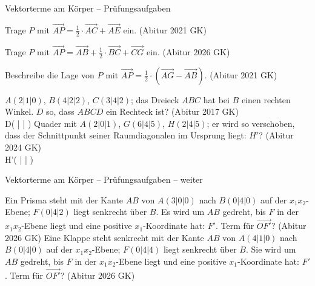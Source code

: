 \begin{aufgabe}{Vektorterme am Körper – Prüfungsaufgaben}
\begin{teile}
\teil Trage $P$ mit $\overrightarrow{AP} = \frac{1}{2} \cdot \overrightarrow{AC} + \overrightarrow{AE}$ ein. \hfill (Abitur 2021 GK)

\begin{ksys3}[x1max=7]          \end{ksys3}
\teil Trage $P$ mit $\overrightarrow{AP} = \overrightarrow{AB} + \frac{1}{2} \cdot \overrightarrow{BC} + \overrightarrow{CG}$ ein. \hfill (Abitur 2026 GK)

\begin{ksys3}[x1max=7]          \end{ksys3}
\teil Beschreibe die Lage von $P$ mit $\overrightarrow{AP} = \frac{1}{2} \cdot (\overrightarrow{AG} - \overrightarrow{AB})$. \hfill (Abitur 2021 GK)

\begin{ksys3}[x1max=7]          \end{ksys3}
\teil $A(2 | 1 | 0)$, $B(4 | 2 | 2)$, $C(3 | 4 | 2)$; das Dreieck $ABC$ hat bei $B$ einen rechten Winkel. $D$ so, dass $ABCD$ ein Rechteck ist? \hfill (Abitur 2017 GK) \\ D( \leerfeld | \leerfeld | \leerfeld )
\teil Quader mit $A(2 | 0 | 1)$, $G(6 | 4 | 5)$, $H(2 | 4 | 5)$; er wird so verschoben, dass der Schnittpunkt seiner Raumdiagonalen im Ursprung liegt: $H'$? \hfill (Abitur 2024 GK) \\ H'( \leerfeld | \leerfeld | \leerfeld )
\end{teile}
\end{aufgabe}

\begin{aufgabe}{Vektorterme am Körper – Prüfungsaufgaben – weiter}
\begin{teile}
\teil Ein Prisma steht mit der Kante $AB$ von $A(3 | 0 | 0)$ nach $B(0 | 4 | 0)$ auf der $x_1x_2$-Ebene; $F(0 | 4 | 2)$ liegt senkrecht über $B$. Es wird um $AB$ gedreht, bis $F$ in der $x_1x_2$-Ebene liegt und eine positive $x_1$-Koordinate hat: $F'$. Term für $\overrightarrow{OF'}$? \hfill (Abitur 2026 GK)
\teil Eine Klappe steht senkrecht mit der Kante $AB$ von $A(4 | 1 | 0)$ nach $B(0 | 4 | 0)$ auf der $x_1x_2$-Ebene; $F(0 | 4 | 4)$ liegt senkrecht über $B$. Sie wird um $AB$ gedreht, bis $F$ in der $x_1x_2$-Ebene liegt und eine positive $x_1$-Koordinate hat: $F'$. Term für $\overrightarrow{OF'}$? \hfill (Abitur 2026 GK)
\end{teile}
\end{aufgabe}

